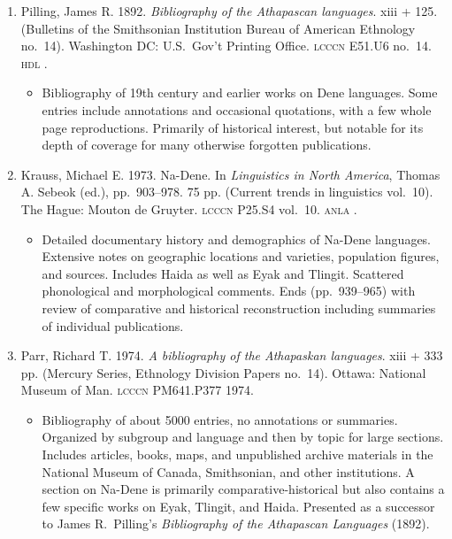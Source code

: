 \documentclass[12pt,letterpaper,oneside,article]{memoir}
\begin{document}
\begin{enumerate}
\item	Pilling, James R.
	1892.
	\textit{Bibliography of the Athapascan languages}.
	xiii + 125.
	(Bulletins of the Smithsonian Institution Bureau of American Ethnology no.\ 14).
	Washington DC: U.S.\ Gov’t Printing Office.
	\textsc{lcccn} E51.U6 no.\ 14.
	\textsc{hdl} .
	\begin{itemize}
	\item	Bibliography of 19th century and earlier works on Dene languages.
		Some entries include annotations and occasional quotations, with a few
		whole page reproductions.
		Primarily of historical interest, but notable for its depth of coverage
		for many otherwise forgotten publications.
	\end{itemize}
\item	Krauss, Michael E.
	1973.
	Na-Dene.
	In \textit{Linguistics in North America},
	Thomas A. Sebeok (ed.), pp.\ 903–978.
	75 pp.
	(Current trends in linguistics vol.\ 10).
	The Hague: Mouton de Gruyter.
	\textsc{lcccn} P25.S4 vol.\ 10.
	\textsc{anla} .
	\begin{itemize}
	\item	Detailed documentary history and demographics of Na-Dene languages.
		Extensive notes on geographic locations and varieties, population
		figures, and sources.
		Includes Haida as well as Eyak and Tlingit.
		Scattered phonological and morphological comments.
		Ends (pp.\ 939–965) with review of comparative and historical
		reconstruction including summaries of individual publications.
	\end{itemize}
\item	Parr, Richard T.
	1974.
	\textit{A bibliography of the Athapaskan languages}.
	xiii + 333 pp.
	(Mercury Series, Ethnology Division Papers no.\ 14).
	Ottawa: National Museum of Man.
	\textsc{lcccn} PM641.P377 1974.
	\begin{itemize}
	\item	Bibliography of about 5000 entries, no annotations or summaries.
		Organized by subgroup and language and then by topic for large sections.
		Includes articles, books, maps, and unpublished archive materials
		in the National Museum of Canada, Smithsonian, and other institutions.
		A section on Na-Dene is primarily comparative-historical but also
		contains a few specific works on Eyak, Tlingit, and Haida.
		Presented as a successor to James R.\ Pilling’s
		\textit{Bibliography of the Athapascan Languages} (1892).
	\end{itemize}

\end{enumerate}
\end{document}
